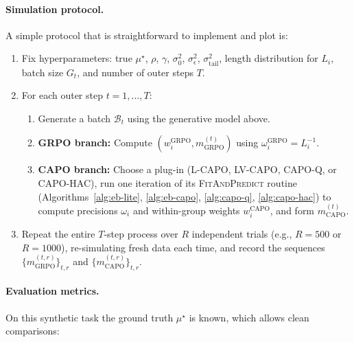 \paragraph{Simulation protocol.}
A simple protocol that is straightforward to implement and plot is:

\begin{enumerate}
  \item Fix hyperparameters: true \(\mu^\star\), \(\rho\), \(\gamma\), \(\sigma_0^2\), \(\sigma_\epsilon^2\), \(\sigma_{\text{tail}}^2\), length distribution for \(L_i\), batch size \(G_t\), and number of outer steps \(T\).
  \item For each outer step \(t=1,\dots,T\):
  \begin{enumerate}
    \item Generate a batch \(\mathcal B_t\) using the generative model above.
    \item \textbf{GRPO branch:} Compute \((w_i^{\mathrm{GRPO}},m_{\mathrm{GRPO}}^{(t)})\) using \(\omega_i^{\mathrm{GRPO}}=L_i^{-1}\).
    \item \textbf{CAPO branch:} Choose a plug-in (L-CAPO, LV-CAPO, CAPO-Q, or CAPO-HAC), run one iteration of its \textsc{FitAndPredict} routine (Algorithms~\ref{alg:eb-lite}, \ref{alg:eb-capo}, \ref{alg:capo-q}, \ref{alg:capo-hac}) to compute precisions \(\omega_i\) and within-group weights \(w_i^{\mathrm{CAPO}}\), and form \(m_{\mathrm{CAPO}}^{(t)}\).
  \end{enumerate}
  \item Repeat the entire \(T\)-step process over \(R\) independent trials (e.g., \(R=500\) or \(R=1000\)), re-simulating fresh data each time, and record the sequences
  \(\{m_{\mathrm{GRPO}}^{(t,r)}\}_{t,r}\) and \(\{m_{\mathrm{CAPO}}^{(t,r)}\}_{t,r}\).
\end{enumerate}

\paragraph{Evaluation metrics.}
On this synthetic task the ground truth \(\mu^\star\) is known, which allows clean comparisons:

